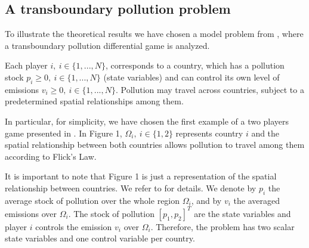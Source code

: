\documentclass[12pt]{article}
\begin{document}
\subsection{A transboundary pollution problem}
To illustrate the theoretical results we have chosen a model problem from \cite{DeFrutos2016},  where a transboundary pollution differential game is analyzed.

Each player $i, \ i\in\{1,...,N\}$, corresponds to a country, which has a pollution stock $p_i\geq 0, \ i\in\{1,...,N\}$ (state variables) and can control its own level of emissions $v_i\geq 0, \ i\in\{1,...,N\}$. Pollution may travel across countries, subject to a predetermined spatial relationships among them.

In particular, for simplicity, we have chosen the first example of a two players game presented in \cite{DeFrutos2016}. In  Figure 1, $\Omega_i, \ i\in\{1,2\}$ represents country $i$ and the spatial relationship between both countries allows pollution to travel among them according to Flick's Law.

It is important to note that Figure 1 is just a representation of the spatial relationship between countries. We
refer to \cite[Appendix B]{DeFrutos2016} for details. We denote by $p_i$ the average stock of pollution over the whole region $\Omega_i$, and by $v_i$ the averaged emissions over $\Omega_i$. The stock of pollution $[p_1,p_2]^T$ are the state variables and player $i$ controls the emission $v_i$ over $\Omega_i$. Therefore, the problem has two
 scalar state variables and one control variable per country.
\end{document}
